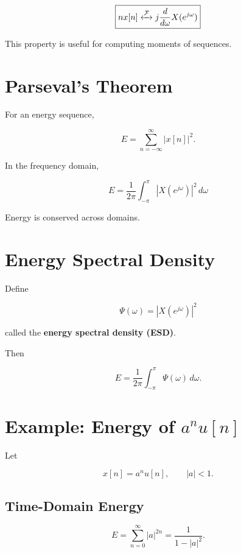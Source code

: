 \[
\boxed{
nx[n]
\xleftrightarrow{\mathcal{F}}
j\frac{d}{d\omega}X(e^{j\omega})
}
\]

This property is useful for computing moments of sequences.


\section{Parseval’s Theorem}

For an energy sequence,

\[
E=
\sum_{n=-\infty}^{\infty}|x[n]|^2.
\]

In the frequency domain,

\[
\boxed{
E=
\frac{1}{2\pi}
\int_{-\pi}^{\pi}
|X(e^{j\omega})|^2\,d\omega
}
\]

Energy is conserved across domains.


\section{Energy Spectral Density}

Define

\[
\boxed{
\Psi(\omega)=|X(e^{j\omega})|^2
}
\]

called the \textbf{energy spectral density (ESD)}.

Then

\[
E=
\frac{1}{2\pi}
\int_{-\pi}^{\pi}
\Psi(\omega)\,d\omega.
\]


\section{Example: Energy of \(a^n u[n]\)}

Let

\[
x[n]=a^n u[n],\qquad |a|<1.
\]


\subsection{Time-Domain Energy}

\[
E=
\sum_{n=0}^{\infty}|a|^{2n}
=
\frac{1}{1-|a|^2}.
\]

